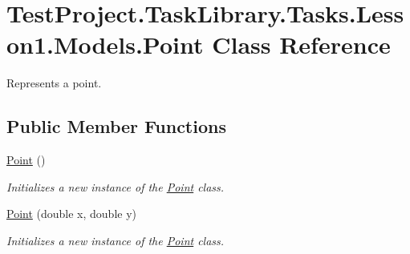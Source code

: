 \hypertarget{class_test_project_1_1_task_library_1_1_tasks_1_1_lesson1_1_1_models_1_1_point}{}\section{Test\+Project.\+Task\+Library.\+Tasks.\+Lesson1.\+Models.\+Point Class Reference}
\label{class_test_project_1_1_task_library_1_1_tasks_1_1_lesson1_1_1_models_1_1_point}


Represents a point.  


\subsection*{Public Member Functions}
\begin{DoxyCompactItemize}
\item 
\mbox{\hyperlink{class_test_project_1_1_task_library_1_1_tasks_1_1_lesson1_1_1_models_1_1_point_a21348a8e6df00a7997ae750cd3febffc}{Point}} ()
\begin{DoxyCompactList}\small\item\em Initializes a new instance of the \mbox{\hyperlink{class_test_project_1_1_task_library_1_1_tasks_1_1_lesson1_1_1_models_1_1_point}{Point}} class. \end{DoxyCompactList}\item 
\mbox{\hyperlink{class_test_project_1_1_task_library_1_1_tasks_1_1_lesson1_1_1_models_1_1_point_a8aeff5ba15b460f78248355f699b3b84}{Point}} (double x, double y)
\begin{DoxyCompactList}\small\item\em Initializes a new instance of the \mbox{\hyperlink{class_test_project_1_1_task_library_1_1_tasks_1_1_lesson1_1_1_models_1_1_point}{Point}} class. \end{DoxyCompactList}\end{DoxyCompactItemize}
